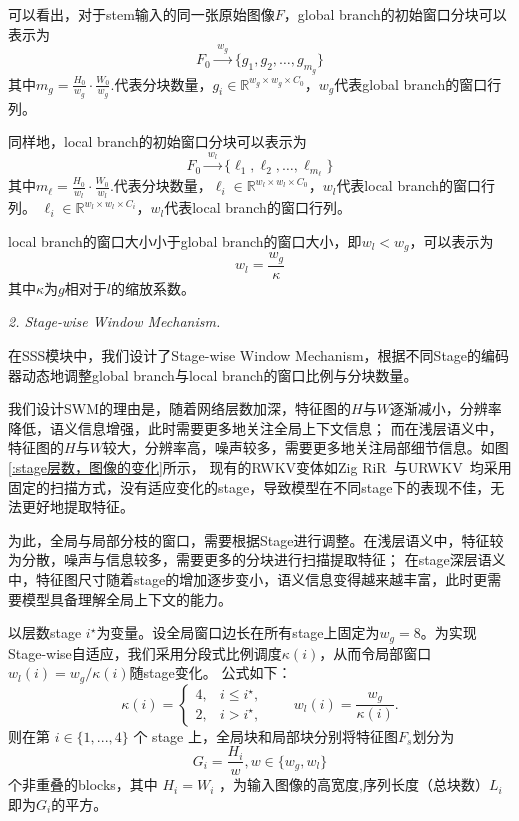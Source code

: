 \documentclass[conference]{IEEEtran}   %
\begin{document}
可以看出，对于stem输入的同一张原始图像$F$，global branch的初始窗口分块可以表示为
\begin{equation}\label{eq:paper-auto-01}F_{0}\xrightarrow{\;w_g\;}\{g_{1},g_{2},\dots,g_{m_g}\}\end{equation}
其中$m_g=\frac{H_0}{w_g}\cdot\frac{W_0}{w_g}.$代表分块数量，$g_{i} \in \mathbb{R}^{w_g \times w_g \times C_0}$，$w_g$代表global branch的窗口行列。


同样地，local branch的初始窗口分块可以表示为\begin{equation}\label{eq:paper-auto-02}F_{0}\xrightarrow{\;w_l\;}\{\ell_{1},\ell_{2},\dots,\ell_{m_\ell}\}\end{equation}
其中$m_\ell=\frac{H_0}{w_l}\cdot\frac{W_0}{w_l}.$代表分块数量，$ \ell_{i} \in \mathbb{R}^{w_l \times w_l \times C_0}$，$w_l$代表local branch的窗口行列。
 $ \ell_{i} \in \mathbb{R}^{w_l \times w_l \times C_i}$，$w_l$代表local branch的窗口行列。

local branch的窗口大小小于global branch的窗口大小，即$w_l < w_g$，可以表示为\begin{equation}\label{eq:paper-auto-03}w_l = \frac{w_g}{\kappa}\end{equation}
其中$\kappa$为$g$相对于$l$的缩放系数。

\textit{2. Stage-wise Window Mechanism.}

在SSS模块中，我们设计了Stage-wise Window Mechanism，根据不同Stage的编码器动态地调整global branch与local branch的窗口比例与分块数量。

我们设计SWM的理由是，随着网络层数加深，特征图的$H$与$W$逐渐减小，分辨率降低，语义信息增强，此时需要更多地关注全局上下文信息；
而在浅层语义中，特征图的$H$与$W$较大，分辨率高，噪声较多，需要更多地关注局部细节信息。如图\ref{:stage层数，图像的变化}所示，
现有的RWKV变体如Zig RiR~\cite{zigrir}与URWKV~\cite{urwkv}均采用
固定的扫描方式，没有适应变化的stage，导致模型在不同stage下的表现不佳，无法更好地提取特征。

为此，全局与局部分枝的窗口，需要根据Stage进行调整。在浅层语义中，特征较为分散，噪声与信息较多，需要更多的分块进行扫描提取特征；
在stage深层语义中，特征图尺寸随着stage的增加逐步变小，语义信息变得越来越丰富，此时更需要模型具备理解全局上下文的能力。

以层数stage $i^\star$为变量。设全局窗口边长在所有stage上固定为$w_g=8$。为实现Stage-wise自适应，我们采用分段式比例调度$\kappa(i)$，从而令局部窗口$w_l(i)=w_g/\kappa(i)$随stage变化。
公式如下：
\begin{equation}
\kappa(i) =
\begin{cases}
4, & i\le i^\star,\\
2, & i> i^\star,   
\end{cases}
\qquad
w_l(i)=\frac{w_g}{\kappa(i)}.
\label{kappa}
\end{equation}
则在第 $i\in \{1,..., 4\}$ 个 stage 上，全局块和局部块分别将特征图$F_s$划分为
\begin{equation}\label{eq:paper-auto-04}G_i = \frac{H_i}{w},w \in \{w_g, w_l\}\end{equation}
个非重叠的blocks，其中 $H_i = W_i$ ，为输入图像的高宽度,序列长度（总块数）$L_i$即为$G_i$的平方。
\end{document}
